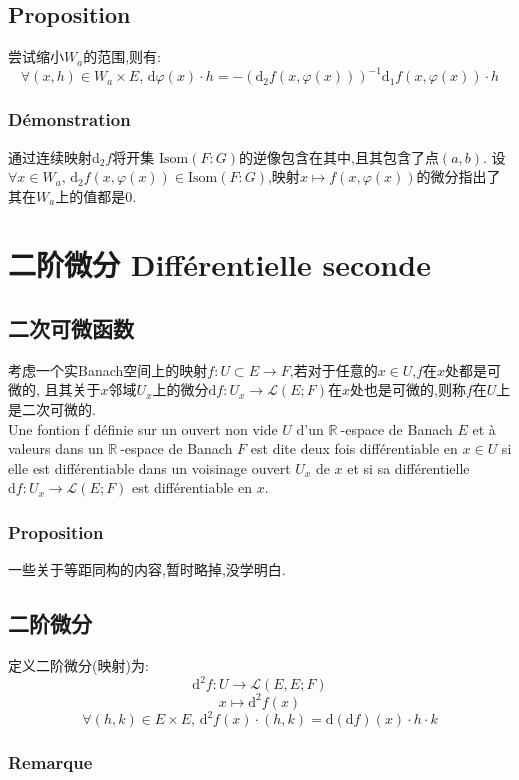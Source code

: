 \documentclass[12pt, a4paper, oneside]{ctexbook}
\newcommand{\di }{\text{d}}%
\newcommand{\fuyi }{^{-1}}%
\newcommand{\R }{\mathbb{R}}%
\newcommand{\RR }{$\R\ $}%
\newcommand{\fai }{\varphi}%
\begin{document}
  \subsection{Proposition}
  尝试缩小$W_a$的范围,则有:
  $$
  \forall (x,h)\in W_a\times E,\,\di \fai(x)\cdot h=-(\di_2f(x,\fai(x)))\fuyi\di_1f(x,\fai(x))\cdot h
  $$
  \subsubsection{Démonstration}
  通过连续映射$\di_2f$将开集 $\text{Isom}(F:G)$的逆像包含在其中,且其包含了点$(a,b)$.
  设$\forall x\in W_a,\,\di_2f(x,\fai(x))\in\text{Isom}(F:G)$,映射$x\mapsto f(x,\fai(x))$的微分指出了其在$W_a$上的值都是0.










\section{二阶微分 Différentielle seconde}
\subsection{二次可微函数}
  考虑一个实Banach空间上的映射$f:U\subset E\rightarrow F$,若对于任意的$x\in U$,$f$在$x$处都是可微的,
  且其关于$x$邻域$U_x$上的微分$\di f:U_x\rightarrow \mathcal{L}(E;F)$在$x$处也是可微的,则称$f$在$U$上是二次可微的.\\
  \indent
  Une fontion f définie sur un ouvert non vide $U$ d'un \RR-espace de Banach $E$ et à valeurs dans un \RR-espace de Banach $F$ est dite 
  deux fois différentiable en $x \in U$ si elle est différentiable dans un voisinage ouvert $U_x$ de $x$ et si sa différentielle 
  $\di f:U_x\rightarrow \mathcal{L}(E;F)$ est différentiable en $x$.
  \subsubsection{Proposition}
  一些关于等距同构的内容,暂时略掉,没学明白.
\subsection{二阶微分}
  定义二阶微分(映射)为:
  $$
    \di^2f:U\rightarrow\mathcal{L}(E,E;F)
  $$
  $$
    x\mapsto \di^2f(x)
  $$
  $$
  \forall(h,k)\in E\times E,\,\di^2f(x)\cdot(h,k)=\di(\di f)(x)\cdot h\cdot k
  $$
  \subsubsection{Remarque}
\end{document}

